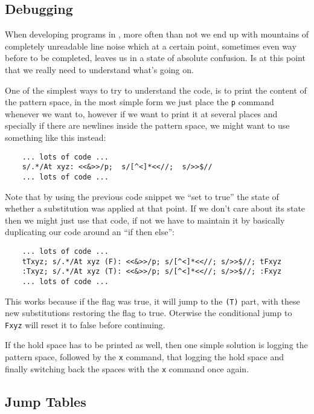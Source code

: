 \subsection{Debugging}

When developing programs in \sed*, more often than not we end up with mountains
of completely unreadable line noise which at a certain point, sometimes even
way before to be completed, leaves us in a state of absolute confusion.  Is at
this point that we really need to understand what's going on.

One of the simplest ways to try to understand the code, is to print the content
of the pattern space, in the most simple form we just place the {\tt p} command
whenever we want to, however if we want to print it at several places and
specially if there are newlines inside the pattern space, we might want to use
something like this instead:

\begin{Verbatim}
	... lots of code ...
	s/.*/At xyz: <<&>>/p;  s/[^<]*<<//;  s/>>$//
	... lots of code ...
\end{Verbatim}

Note that by using the previous code snippet we ``set to true'' the state of
whether a substitution was applied at that point.  If we don't care about its
state then we might just use that code, if not we have to maintain it by
basically duplicating our code around an ``if then else'':

\begin{Verbatim}
	... lots of code ...
	tTxyz; s/.*/At xyz (F): <<&>>/p; s/[^<]*<<//; s/>>$//; tFxyz
	:Txyz; s/.*/At xyz (T): <<&>>/p; s/[^<]*<<//; s/>>$//; :Fxyz
	... lots of code ...
\end{Verbatim}

This works because if the flag was true, it will jump to the {\tt (T)} part,
with these new substitutions restoring the flag to true.
Oterwise the conditional jump to {\tt Fxyz} will reset it to false
before continuing.

If the hold space has to be printed as well, then one simple solution is
logging the pattern space, followed by the {\tt x} command, that logging
the hold space and finally switching back the spaces with the {\tt x}
command once again.


\subsection{Jump Tables}

